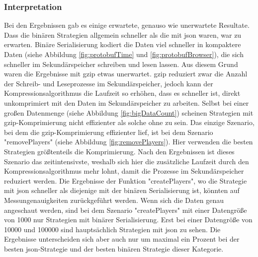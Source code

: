 \subsubsection{Interpretation}
Bei den Ergebnissen gab es einige erwartete, genauso wie unerwartete Resultate. Dass die binären Strategien allgemein schneller als die mit \ac{json} waren, war zu erwarten. Binäre Serialisierung kodiert die Daten viel schneller in kompaktere Daten (siehe Abbildung \ref{fig:protobufTime} und \ref{fig:protobufBrowser}), die sich schneller im Sekundärspeicher schreiben und lesen lassen. Aus diesem Grund waren die Ergebnisse mit \ac{gzip} etwas unerwartet. \ac{gzip} reduziert zwar die Anzahl der Schreib- und Leseprozesse im Sekundärspeicher, jedoch kann der Kompressionsalgorithmus die Laufzeit so erhöhen, dass es schneller ist, direkt unkomprimiert mit den Daten im Sekundärspeicher zu arbeiten. Selbst bei einer großen Datenmenge (siehe Abbildung \ref{fig:bigDataCount}) scheinen Strategien mit \ac{gzip}-Komprimierung nicht effizienter als solche ohne zu sein. Das einzige Szenario, bei dem die \ac{gzip}-Komprimierung effizienter lief, ist bei dem Szenario "removePlayers" (siehe Abbildung \ref{fig:removePlayers}). Hier verwenden die besten Strategien größtenteils die Komprimierung. Nach den Ergebnissen ist dieses Szenario das zeitintensivste, weshalb sich hier die zusätzliche Laufzeit durch den Kompressionsalgorithmus mehr lohnt, damit die Prozesse im Sekundärspeicher reduziert werden. Die Ergebnisse der Funktion "createPlayers", wo die Strategie mit \ac{json} schneller als diejenige mit der binären Serialisierung ist, könnten auf Messungenauigkeiten zurückgeführt werden. Wenn sich die Daten genau angeschaut werden, sind bei dem Szenario "createPlayers" mit einer Datengröße von 1000 nur Strategien mit binärer Serialisierung. Erst bei einer Datengröße von 10000 und 100000 sind hauptsächlich Strategien mit \ac{json} zu sehen. Die Ergebnisse unterscheiden sich aber auch nur um maximal ein Prozent bei der besten \ac{json}-Strategie und der besten binären Strategie dieser Kategorie.

